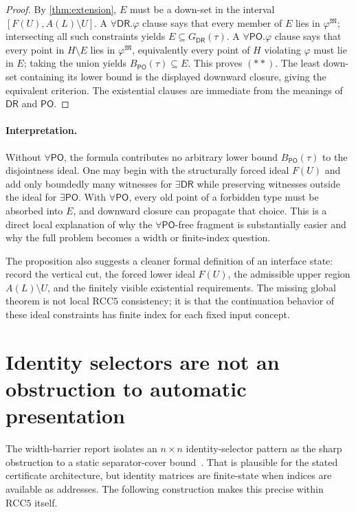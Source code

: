 \documentclass[11pt]{article}
\theoremstyle{definition}
\theoremstyle{remark}
\newcommand{\RCC}{\mathrm{RCC5}}
\newcommand{\PO}{\mathsf{PO}}
\newcommand{\DR}{\mathsf{DR}}
\begin{document}
\begin{proof}
By \cref{thm:extension}, $E$ must be a down-set in the interval $[F(U),A(L)\setminus U]$.  A $\forall\DR.\varphi$ clause says that every member of $E$ lies in $\varphi^{\mathfrak M}$; intersecting all such constraints yields $E\subseteq G_{\DR}(\tau)$.  A $\forall\PO.\varphi$ clause says that every point in $H\setminus E$ lies in $\varphi^{\mathfrak M}$, equivalently every point of $H$ violating $\varphi$ must lie in $E$; taking the union yields $B_{\PO}(\tau)\subseteq E$.  This proves \((**)\).  The least down-set containing its lower bound is the displayed downward closure, giving the equivalent criterion.  The existential clauses are immediate from the meanings of $\DR$ and $\PO$.
\end{proof}

\paragraph{Interpretation.}
Without $\forall\PO$, the formula contributes no arbitrary lower bound $B_{\PO}(\tau)$ to the disjointness ideal.  One may begin with the structurally forced ideal $F(U)$ and add only boundedly many witnesses for $\exists\DR$ while preserving witnesses outside the ideal for $\exists\PO$.  With $\forall\PO$, every old point of a forbidden type must be absorbed into $E$, and downward closure can propagate that choice.  This is a direct local explanation of why the $\forall\PO$-free fragment is substantially easier and why the full problem becomes a width or finite-index question.

The proposition also suggests a cleaner formal definition of an interface state: record the vertical cut, the forced lower ideal $F(U)$, the admissible upper region $A(L)\setminus U$, and the finitely visible existential requirements.  The missing global theorem is not local $\RCC$ consistency; it is that the continuation behavior of these ideal constraints has finite index for each fixed input concept.

\section{Identity selectors are not an obstruction to automatic presentation}

The width-barrier report isolates an $n\times n$ identity-selector pattern as the sharp obstruction to a static separator-cover bound~\cite[Sec.~9]{WidthBarrier}.  That is plausible for the stated certificate architecture, but identity matrices are finite-state when indices are available as addresses.  The following construction makes this precise within $\RCC$ itself.
\end{document}
